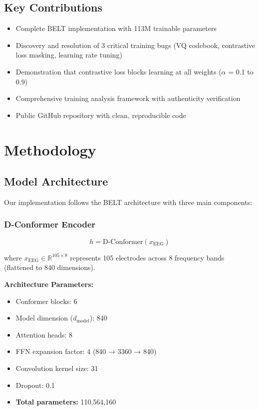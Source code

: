 \documentclass[12pt,a4paper]{article}
\begin{document}
\subsection{Key Contributions}
\begin{itemize}
    \item Complete BELT implementation with 113M trainable parameters
    \item Discovery and resolution of 3 critical training bugs (VQ codebook, contrastive loss masking, learning rate tuning)
    \item Demonstration that contrastive loss blocks learning at all weights ($\alpha$ = 0.1 to 0.9)
    \item Comprehensive training analysis framework with authenticity verification
    \item Public GitHub repository with clean, reproducible code
\end{itemize}

\section{Methodology}

\subsection{Model Architecture}

Our implementation follows the BELT architecture with three main components:

\subsubsection{D-Conformer Encoder}
\begin{equation}
h = \text{D-Conformer}(x_{\text{EEG}})
\end{equation}

\noindent where $x_{\text{EEG}} \in \mathbb{R}^{105 \times 8}$ represents 105 electrodes across 8 frequency bands (flattened to 840 dimensions).

\textbf{Architecture Parameters:}
\begin{itemize}
    \item Conformer blocks: 6
    \item Model dimension ($d_{\text{model}}$): 840
    \item Attention heads: 8
    \item FFN expansion factor: 4 (840 → 3360 → 840)
    \item Convolution kernel size: 31
    \item Dropout: 0.1
    \item \textbf{Total parameters:} 110,564,160
\end{itemize}
\end{document}
